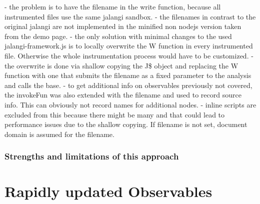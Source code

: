 	- the problem is to have the filename in the write function, because all instrumented files use the same jalangi sandbox.
	- the filenames in contrast to the original jalangi are not implemented in the minified non nodejs version taken from the demo page.
	- the only solution with minimal changes to the used jalangi-framework.js is to locally overwrite the W function in every instrumented file. Otherwise the whole instrumentation process would have to be customized.
	- the overwrite is done via shallow copying the J\$ object and replacing the W function with one that submits the filename as a fixed parameter to the analysis and calls the base.
	- to get additional info on observables previously not covered, the invokeFun was also extended with the filename and used to record source info. This can obviously not record names for additional nodes.
	- inline scripts are excluded from this because there might be many and that could lead to performance issues due to the shallow copying.
	If filename is not set, document domain is assumed for the filename.
	
	
		\subsubsection{Strengths and limitations of this approach} 

\section{Rapidly updated Observables}
\label{sec:RapidlyUpdatedObservables}
	
